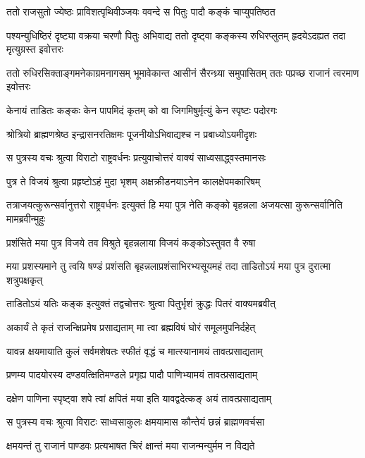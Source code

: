 \twolineshloka
{ततो राजसुतो ज्येष्ठः प्राविशत्पृथिवीञ्जयः}
{ववन्दे स पितुः पादौ कङ्कं चाप्युपतिष्ठत}


\threelineshloka
{पश्यन्युधिष्ठिरं दृष्ट्या वक्रया चरणौ पितुः}
{अभिवाद्य ततो दृष्ट्वा कङ्कस्य रुधिरप्लुतम्}
{हृदयेऽदह्यत तदा मृत्युग्रस्त इवोत्तरः}


\threelineshloka
{ततो रुधिरसिक्ताङ्गमनेकाग्रमनागसम्}
{भूमावेकान्त आसीनं सैरन्ध्र्या समुपासितम्}
{ततः पप्रच्छ राजानं त्वरमाण इवोत्तरः}


\twolineshloka
{केनायं ताडितः कङ्कः केन पापमिदं कृतम्}
{को वा जिगमिषुर्मृत्युं केन स्पृष्टः पदोरगः}


\twolineshloka
{श्रोत्रियो ब्राह्मणश्रेष्ठ इन्द्रासनरतिक्षमः}
{पूजनीयोऽभिवाद्यश्च न प्रबाध्योऽयमीदृशः}



\twolineshloka
{स पुत्रस्य वचः श्रुत्वा विराटो राष्ट्रवर्धनः}
{प्रत्युवाचोत्तरं वाक्यं साध्वसाद्ध्वस्तमानसः}


\twolineshloka
{पुत्र ते विजयं श्रुत्वा प्रहृष्टोऽहं मुदा भृशम्}
{अक्षक्रीडनयाऽनेन कालक्षेपमकारिषम्}


\threelineshloka
{तत्राजयत्कुरून्सर्वानुत्तरो राष्ट्रवर्धनः}
{इत्युक्तं हि मया पुत्र नेति कङ्को बृहन्नला}
{अजयत्सा कुरून्सर्वानिति मामब्रवीन्मुहुः}


\twolineshloka
{प्रशंसिते मया पुत्र विजये तव विश्रुते}
{बृहन्नलाया विजयं कङ्कोऽस्तुवत वै रुषा}


\threelineshloka
{मया प्रशस्यमाने तु त्वयि षण्डं प्रशंसति}
{बृहन्नलाप्रशंसाभिरभ्यसूयमहं तदा}
{ताडितोऽयं मया पुत्र दुरात्मा शत्रुपक्षकृत्}


\twolineshloka
{ताडितोऽयं यतिः कङ्क इत्युक्तं तद्वचोत्तरः}
{श्रुत्वा पितुर्भृशं क्रुद्धः पितरं वाक्यमब्रवीत्}


\twolineshloka
{अकार्यं ते कृतं राजन्क्षिप्रमेष प्रसाद्यताम्}
{मा त्वा ब्रह्मविषं घोरं समूलमुपनिर्दहेत्}


\twolineshloka
{यावन्न क्षयमायाति कुलं सर्वमशेषतः}
{स्फीतं वृद्धं च मात्स्यानामयं तावत्प्रसाद्यताम्}


\twolineshloka
{प्रणम्य पादयोरस्य दण्डवत्क्षितिमण्डले}
{प्रगृह्य पादौ पाणिभ्यामयं तावत्प्रसाद्यताम्}


\twolineshloka
{दक्षेण पाणिना स्पृष्ट्वा शपे त्वां क्षपितं मया}
{इति यावद्वदेत्कङ् अयं तावत्प्रसाद्यताम्}


\twolineshloka
{स पुत्रस्य वचः श्रुत्वा विराटः साध्वसाकुलः}
{क्षमयामास कौन्तेयं छन्नं ब्राह्मणवर्चसा}


\twolineshloka
{क्षमयन्तं तु राजानं पाण्डवः प्रत्यभाषत}
{चिरं क्षान्तं मया राजन्मन्युर्मम न विद्यते}


